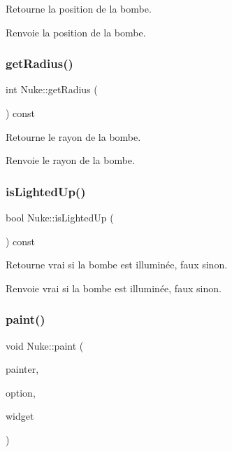 Retourne la position de la bombe. \begin{DoxyReturn}{Renvoie}
la position de la bombe. 
\end{DoxyReturn}
\mbox{\label{class_nuke_ab04e87e07148c5f30f2e85af298baea2}} 
\subsubsection{\texorpdfstring{getRadius()}{getRadius()}}
{\footnotesize\ttfamily int Nuke\+::get\+Radius (\begin{DoxyParamCaption}{ }\end{DoxyParamCaption}) const}

Retourne le rayon de la bombe. \begin{DoxyReturn}{Renvoie}
le rayon de la bombe. 
\end{DoxyReturn}
\mbox{\label{class_nuke_a4ebcb9af0b1cb82d707e0e2103f989cd}} 
\subsubsection{\texorpdfstring{isLightedUp()}{isLightedUp()}}
{\footnotesize\ttfamily bool Nuke\+::is\+Lighted\+Up (\begin{DoxyParamCaption}{ }\end{DoxyParamCaption}) const}

Retourne vrai si la bombe est illuminée, faux sinon. \begin{DoxyReturn}{Renvoie}
vrai si la bombe est illuminée, faux sinon. 
\end{DoxyReturn}
\mbox{\label{class_nuke_a10ed7d69df10cde51b39420943baad83}} 
\subsubsection{\texorpdfstring{paint()}{paint()}}
{\footnotesize\ttfamily void Nuke\+::paint (\begin{DoxyParamCaption}\item[{Q\+Painter $\ast$}]{painter,  }\item[{const Q\+Style\+Option\+Graphics\+Item $\ast$}]{option,  }\item[{Q\+Widget $\ast$}]{widget }\end{DoxyParamCaption})}

